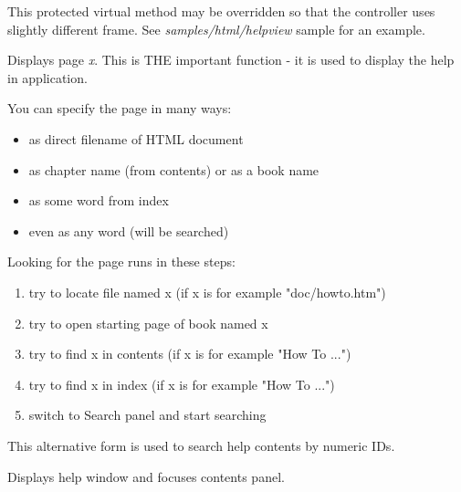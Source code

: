 This protected virtual method may be overridden so that the controller
uses slightly different frame. See {\it samples/html/helpview} sample for
an example.
\label{wxhtmlhelpcontrollerdisplay}


Displays page {\it x}. This is THE important function - it is used to display
the help in application.

You can specify the page in many ways:

\begin{itemize}\itemsep=0pt
\item as direct filename of HTML document
\item as chapter name (from contents) or as a book name
\item as some word from index
\item even as any word (will be searched)
\end{itemize}

Looking for the page runs in these steps:

\begin{enumerate}\itemsep=0pt
\item try to locate file named x (if x is for example "doc/howto.htm")
\item try to open starting page of book named x
\item try to find x in contents (if x is for example "How To ...")
\item try to find x in index (if x is for example "How To ...")
\item switch to Search panel and start searching
\end{enumerate}


This alternative form is used to search help contents by numeric IDs.


\label{wxhtmlhelpcontrollerdisplaycontents}


Displays help window and focuses contents panel.

\label{wxhtmlhelpcontrollerdisplayindex}



